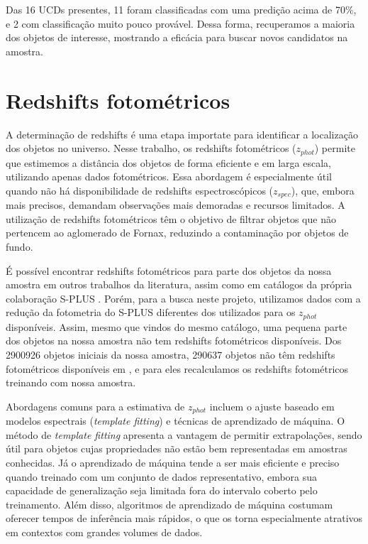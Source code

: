Das 16 UCDs presentes, 11 foram classificadas com uma predição acima de 70\%, e 2 com classificação muito pouco provável. Dessa forma, recuperamos a maioria dos objetos de interesse, mostrando a eficácia para buscar novos candidatos na amostra.

\section{Redshifts fotométricos}\label{sec:zphot}

A determinação de redshifts é uma etapa importate para identificar a localização dos objetos no universo. Nesse trabalho, os redshifts fotométricos (\textit{$z_{phot}$}) permite que estimemos a distância dos objetos de forma eficiente e em larga escala, utilizando apenas dados fotométricos. Essa abordagem é especialmente útil quando não há disponibilidade de redshifts espectroscópicos (\textit{$z_{spec}$}), que, embora mais precisos, demandam observações mais demoradas e recursos limitados. A utilização de redshifts fotométricos têm o objetivo de filtrar objetos que não pertencem ao aglomerado de Fornax, reduzindo a contaminação por objetos de fundo.


É possível encontrar redshifts fotométricos para parte dos objetos da nossa amostra em outros trabalhos da literatura, assim como em catálogos da própria colaboração S-PLUS \citep{erik_photoz_2024}. Porém, para a busca neste projeto, utilizamos dados com a redução da fotometria do S-PLUS diferentes dos utilizados para os \textit{$z_{phot}$} disponíveis. Assim, mesmo que vindos do mesmo catálogo, uma pequena parte dos objetos na nossa amostra não tem redshifts fotométricos disponíveis. Dos 2900926 objetos iniciais da nossa amostra, 290637 objetos não têm redshifts fotométricos disponíveis em \citep{erik_photoz_2024}, e para eles recalculamos os redshifts fotométricos treinando com nossa amostra.

Abordagens comuns para a estimativa de \textit{$z_{phot}$} incluem o ajuste baseado em modelos espectrais (\textit{template fitting}) e técnicas de aprendizado de máquina. O método de \textit{template fitting} apresenta a vantagem de permitir extrapolações, sendo útil para objetos cujas propriedades não estão bem representadas em amostras conhecidas. Já o aprendizado de máquina tende a ser mais eficiente e preciso quando treinado com um conjunto de dados representativo, embora sua capacidade de generalização seja limitada fora do intervalo coberto pelo treinamento. Além disso, algoritmos de aprendizado de máquina costumam oferecer tempos de inferência mais rápidos, o que os torna especialmente atrativos em contextos com grandes volumes de dados.

